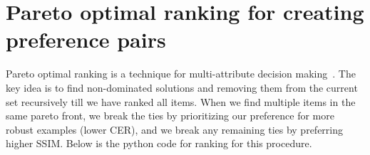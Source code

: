 \section{Pareto optimal ranking for creating preference pairs}
\label{paretorankingalgo}
Pareto optimal ranking is a technique for multi-attribute decision making~\cite{deb2011multi}. The key idea is to find non-dominated solutions and removing them from the current set recursively till we have ranked all items. When we find multiple items in the same pareto front, we break the ties by prioritizing our preference for more robust examples (lower CER), and we break any remaining ties by preferring higher SSIM. Below is the python code for ranking for this procedure.

